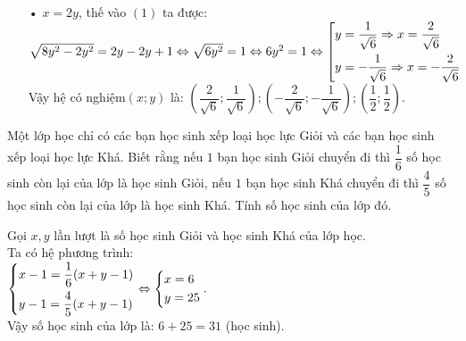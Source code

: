 \begin{ex}
{\begin{enumerate}[1)]
        \item[•] $x=2y$, thế vào $(1)$ ta được:\\ $\sqrt{8y^2-2y^2}=2y-2y+1 \Leftrightarrow \sqrt{6y^2}=1 \Leftrightarrow 6y^2=1  \Leftrightarrow \left[\begin{aligned}&y=\dfrac{1}{\sqrt{6}} \Rightarrow x=\dfrac{2}{\sqrt{6}} \\&y=-\dfrac{1}{\sqrt{6}} \Rightarrow x=-\dfrac{2}{\sqrt{6}}\end{aligned}\right.$\\
        Vậy hệ có nghiệm$(x;y)$ là: $\left(\dfrac{2}{\sqrt{6}};\dfrac{1}{\sqrt{6}}\right);\left(-\dfrac{2}{\sqrt{6}};-\dfrac{1}{\sqrt{6}}\right);\left(\dfrac{1}{2};\dfrac{1}{2}\right)$.
    \end{enumerate}
    }
\end{ex}

\begin{ex}%
    Một lớp học chỉ có các bạn học sinh xếp loại học lực Giỏi và các bạn học sinh xếp loại học lực Khá. Biết rằng nếu $1$ bạn học sinh Giỏi chuyển đi thì $\dfrac{1}{6}$ số học sinh còn lại của lớp là học sinh Giỏi, nếu $1$ bạn học sinh Khá chuyển đi thì $\dfrac{4}{5}$ số học sinh còn lại của lớp là học sinh Khá. Tính số học sinh của lớp đó.
\loigiai
    {Gọi $x,y$ lần lượt là số học sinh Giỏi và học sinh Khá của lớp học.\\
    Ta có hệ phương trình:\\
    $\left\{\begin{aligned}&x-1=\dfrac{1}{6}(x+y-1) \\ &y-1=\dfrac{4}{5}(x+y-1)\end{aligned}\right. \Leftrightarrow \left\{\begin{aligned}&x=6\\&y=25\end{aligned}\right..$\\
    Vậy số học sinh của lớp là: $6+25=31$ (học sinh).
   
    }
\end{ex}

